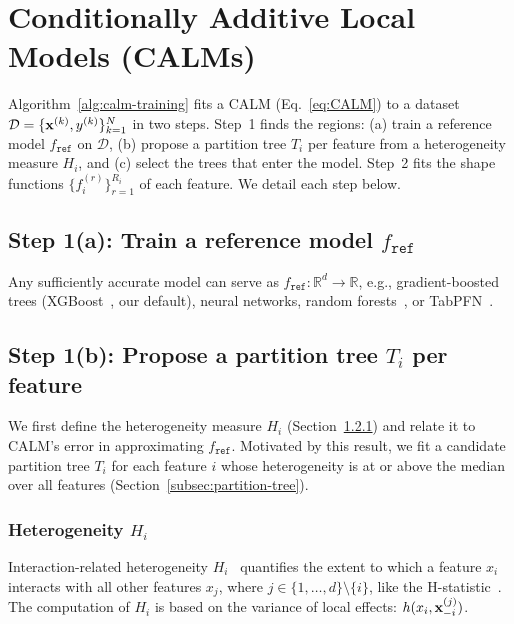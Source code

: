 \section{Conditionally Additive Local Models (CALMs)}
\label{app:learning-rams}

Algorithm~\ref{alg:calm-training} fits a CALM (Eq.~\eqref{eq:CALM}) to a dataset $\mathcal{D} = \{\mathbf{x}^{(k)}, y^{(k)}\}_{k=1}^N$ in two steps. Step~1 finds the regions: (a) train a reference model \(f_{\mathtt{ref}}\) on $\mathcal{D}$, (b) propose a partition tree $T_i$ per feature from a heterogeneity measure $H_i$, and (c) select the trees that enter the model. Step~2 fits the shape functions \( \{ f_i^{(r)} \}_{r=1}^{R_i} \) of each feature.
We detail each step below.

\subsection{Step 1(a): Train a reference model \(f_{\mathtt{ref}}\)}

Any sufficiently accurate model can serve as \(f_{\mathtt{ref}}: \mathbb{R}^d \rightarrow \mathbb{R}\), e.g., gradient-boosted trees (XGBoost~\cite{chen2016xgboost}, our default), neural networks, random forests~\cite{breiman2001random}, or TabPFN~\cite{hollmann2022tabpfn}.

\subsection{Step 1(b): Propose a partition tree $T_i$ per feature}

We first define the heterogeneity measure $H_i$ (Section~\ref{subsec:heterogeneity-measures}) and relate it to CALM's error in approximating $f_{\texttt{ref}}$. Motivated by this result, we fit a candidate partition tree \(T_i\) for each feature \(i\) whose heterogeneity is at or above the median over all features (Section~\ref{subsec:partition-tree}).

\subsubsection{Heterogeneity $H_i$}
\label{subsec:heterogeneity-measures}

Interaction-related heterogeneity $H_i$~\cite{herbinger2024GADGET} quantifies the extent to which a feature $x_i$ interacts with all other features \(x_j\), where \(j \in \{1, \ldots, d\} \setminus \{i\}\), like the H-statistic~\cite{friedman2008predictive}.
The computation of $H_i$ is based on the variance of local effects: $h(x_i , \mathbf{x}_{-i}^{(j)})$.

